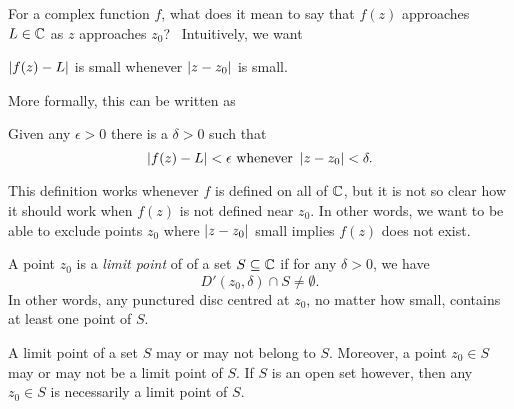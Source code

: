  For a complex function $f$, what does it mean to say that $f(z)$ approaches $L \in \mathbb{C}$ as $z$ approaches $z_0$?  \ Intuitively, we want
 \begin{center}
 $\left| f(z)-L \right|$ is small whenever  $\left| z-z_0 \right|$ is small.
 \end{center}
  More formally, this can be written as
 \begin{center}
 Given any $\epsilon>0$ there is a $\delta>0$ such that
 \[
 \left| f(z)-L \right| < \epsilon\text{ whenever } \left| z-z_0 \right|<\delta.
 \]
 \end{center}
 
 This definition works whenever $f$ is defined on all of $\mathbb{C}$, but it is not so clear how it should work when $f(z)$ is not defined near $z_0$. In other words, we want to be able to exclude points $z_0$ where $\left| z-z_0 \right|$ small implies $f(z)$ does not exist. 
 \begin{comment}
 Recall the following definition from Foundations II: given a set $A \subseteq \R$, a point $x_0$ is a \emph{limit point} of $A$ if whenever $I$ is an open interval with $x_0 \in I$, then $I$ contains an element of $A \backslash \set{x_0}$.
 
 We define limit points of subsets of $\C$ in almost exactly the same way, replacing open intervals with open discs.
 \end{comment}
 
 \begin{definition}
 A point $z_0$ is a \emph{limit point} of of a set $S \subseteq \mathbb{C}$  if for any $\delta>0$, we have
 \[
 D'(z_0,\delta) \cap S \neq \emptyset.
 \]
 In other words, any punctured disc centred at $z_0$, no matter how small, contains at least one point of $S$.
 \end{definition}

A limit point of a set $S$ may or may not belong to $S$.  Moreover, a point $z_0 \in S$ may or may not be a limit point of $S$.  If $S$ is an open set however, then any $z_0 \in S$ is necessarily a limit point of $S$.



